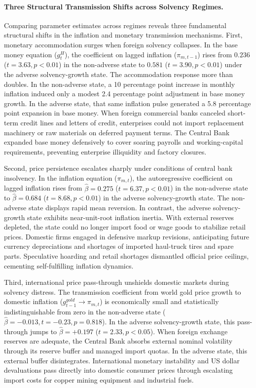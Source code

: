 \paragraph{Three Structural Transmission Shifts across Solvency Regimes.}
Comparing parameter estimates across regimes reveals three fundamental structural shifts in the inflation and monetary transmission mechanisms. First, monetary accommodation surges when foreign solvency collapses. In the base money equation ($g^H_t$), the coefficient on lagged inflation ($\pi_{m,t-1}$) rises from $0.236$ ($t = 3.63, p < 0.01$) in the non-adverse state to $0.581$ ($t = 3.90, p < 0.01$) under the adverse solvency-growth state. The accommodation response more than doubles. In the non-adverse state, a 10 percentage point increase in monthly inflation induced only a modest 2.4 percentage point adjustment in base money growth. In the adverse state, that same inflation pulse generated a 5.8 percentage point expansion in base money. When foreign commercial banks canceled short-term credit lines and letters of credit, enterprises could not import replacement machinery or raw materials on deferred payment terms. The Central Bank expanded base money defensively to cover soaring payrolls and working-capital requirements, preventing enterprise illiquidity and factory closures.

Second, price persistence escalates sharply under conditions of central bank insolvency. In the inflation equation ($\pi_{m,t}$), the autoregressive coefficient on lagged inflation rises from $\hat{\beta} = 0.275$ ($t = 6.37, p < 0.01$) in the non-adverse state to $\hat{\beta} = 0.684$ ($t = 8.68, p < 0.01$) in the adverse solvency-growth state. The non-adverse state displays rapid mean reversion. In contrast, the adverse solvency-growth state exhibits near-unit-root inflation inertia. With external reserves depleted, the state could no longer import food or wage goods to stabilize retail prices. Domestic firms engaged in defensive markup revisions, anticipating future currency depreciations and shortages of imported haul-truck tires and spare parts. Speculative hoarding and retail shortages dismantled official price ceilings, cementing self-fulfilling inflation dynamics.

Third, international price pass-through unshields domestic markets during solvency distress. The transmission coefficient from world gold price growth to domestic inflation ($g^{gold}_{t-1} \to \pi_{m,t}$) is economically small and statistically indistinguishable from zero in the non-adverse state ($\hat{\beta} = -0.013, t = -0.23, p = 0.818$). In the adverse solvency-growth state, this pass-through jumps to $\hat{\beta} = +0.197$ ($t = 2.33, p < 0.05$). When foreign exchange reserves are adequate, the Central Bank absorbs external nominal volatility through its reserve buffer and managed import quotas. In the adverse state, this external buffer disintegrates. International monetary instability and US dollar devaluations pass directly into domestic consumer prices through escalating import costs for copper mining equipment and industrial fuels.

